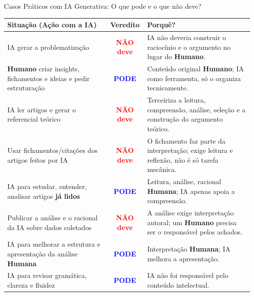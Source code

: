 \documentclass[aspectratio=169]{beamer}
\begin{document}
\begin{frame}{Casos Práticos com IA Generativa: O que pode e o que não deve?}
    \scriptsize %
    \begin{center}
        \renewcommand{\arraystretch}{1.2} %
        \vspace{-1}
        \begin{tabular}[t]{|p{4.5cm}|c|p{6.5cm}|}
            \hline
            \textbf{Situação (Ação com a IA)} & \textbf{Veredito} & \textbf{Porquê?} \\
            \hline
            IA gerar a problematização & \textcolor{red}{\textbf{NÃO deve}} & IA não deveria construir o raciocínio e o argumento no lugar do \textbf{Humano}. \\
            \hline
            \textbf{Humano} criar insights, fichamentos e ideias e pedir estruturação & \textcolor{blue}{\textbf{PODE}} & Conteúdo original \textbf{Humano}; IA como ferramenta, só o organiza tecnicamente. \\
            \hline
            IA ler artigos e gerar o referencial teórico & \textcolor{red}{\textbf{NÃO deve}} & Terceiriza a leitura, compreensão, análise, seleção e a construção do argumento teórico. \\
            \hline
            Usar fichamentos/citações dos artigos feitos por IA  & \textcolor{red}{\textbf{NÃO deve}} & O fichamento faz parte da interpretação; exige leitura e reflexão, não é só tarefa mecânica. \\
            \hline
            IA para estudar, entender, analisar artigos \textbf{já lidos} & \textcolor{blue}{\textbf{PODE}} & Leitura, análise, racional \textbf{Humana}; IA apenas apoia a compreensão. \\
            \hline
            Publicar a análise e o racional da IA sobre dados coletados & \textcolor{red}{\textbf{NÃO deve}} & A análise exige interpretação autoral; um \textbf{Humano} precisa ser o responsável pelos achados. \\
            \hline
            IA para melhorar a estrutura e apresentação da análise \textbf{Humana} & \textcolor{blue}{\textbf{PODE}} & Interpretação \textbf{Humana}; IA melhora a apresentação. \\
            \hline
            IA para revisar gramática, clareza e fluidez & \textcolor{blue}{\textbf{PODE}} & IA não foi responsável pelo conteúdo intelectual. \\
            \hline
        \end{tabular}
    \end{center}
\end{frame}
\end{document}
